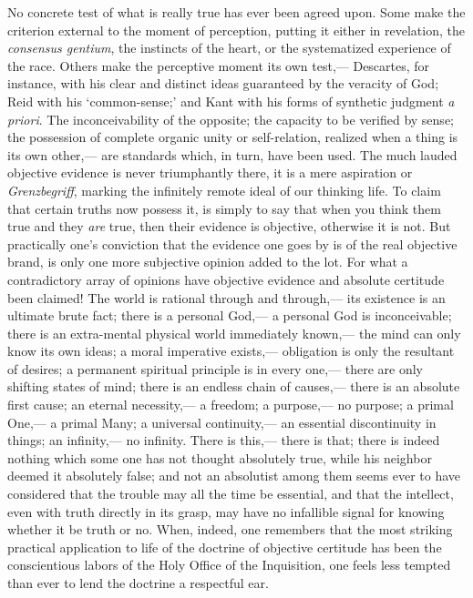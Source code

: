 \documentclass[12pt]{article}
\begin{document}
No concrete test of what is really true has ever been agreed upon. Some make the criterion external to the moment of perception, putting it either in revelation, the \emph{consensus gentium}, the instincts of the heart, or the systematized experience of the race.  Others make the perceptive moment its own test,--- Descartes, for instance, with his clear and distinct ideas guaranteed by the veracity of God; Reid with his `common-sense;' and Kant with his forms of synthetic judgment \emph{a priori}.  The inconceivability of the opposite; the capacity to be verified by sense; the possession of complete organic unity or self-relation, realized when a thing is its own other,--- are standards which, in turn, have been used.  The much  lauded objective evidence is never triumphantly there, it is a mere aspiration or \emph{Grenzbegriff}, marking the infinitely remote ideal of our thinking life.  To claim that certain truths now possess it, is simply to say that when you think them true and they \emph{are} true, then their evidence is objective, otherwise it is not.  But practically one's conviction that the evidence one goes by is of the real objective brand, is only one more subjective opinion added to the lot.  For what a contradictory array of opinions have objective evidence and absolute certitude been claimed!  The world is rational through and through,--- its existence is an ultimate brute fact; there is a personal God,--- a personal God is inconceivable; there is an extra-mental physical world immediately known,--- the mind can only know its own ideas; a moral imperative exists,--- obligation is only the resultant of desires; a permanent spiritual principle is in every one,--- there are only shifting states of mind; there is an endless chain of causes,--- there is an absolute first cause; an eternal necessity,--- a freedom; a purpose,--- no purpose; a primal One,--- a primal Many; a universal continuity,--- an essential discontinuity in things; an infinity,--- no infinity.  There is this,--- there is that; there is indeed nothing which some one has not thought absolutely true, while his neighbor deemed it absolutely false; and not an absolutist among them seems ever to have considered that the trouble may all the time be essential, and that the intellect, even with truth directly in its grasp, may have no infallible signal for knowing whether it be truth or no.  When, indeed, one remembers that the most striking practical application to life of the doctrine of objective certitude has been  the conscientious labors of the Holy Office of the Inquisition, one feels less tempted than ever to lend the doctrine a respectful ear.
\end{document}
